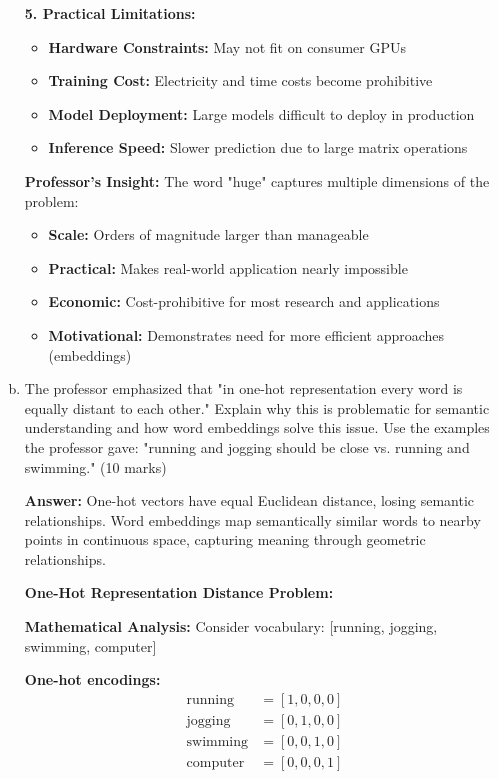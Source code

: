 \documentclass[12pt]{article}
\newcommand{\answer}[1]{{\color{answercolor}\textbf{Answer:} #1}}
\newcommand{\explanation}[1]{{\color{explanationcolor}#1}}
\begin{document}
\begin{enumerate}[(a)]
{    \textbf{5. Practical Limitations:}
    \begin{itemize}
        \item \textbf{Hardware Constraints:} May not fit on consumer GPUs
        \item \textbf{Training Cost:} Electricity and time costs become prohibitive
        \item \textbf{Model Deployment:} Large models difficult to deploy in production
        \item \textbf{Inference Speed:} Slower prediction due to large matrix operations
    \end{itemize}
    
    \textbf{Professor's Insight:}
    The word "huge" captures multiple dimensions of the problem:
    \begin{itemize}
        \item \textbf{Scale:} Orders of magnitude larger than manageable
        \item \textbf{Practical:} Makes real-world application nearly impossible
        \item \textbf{Economic:} Cost-prohibitive for most research and applications
        \item \textbf{Motivational:} Demonstrates need for more efficient approaches (embeddings)
    \end{itemize}
    }
    
    \item The professor emphasized that "in one-hot representation every word is equally distant to each other." Explain why this is problematic for semantic understanding and how word embeddings solve this issue. Use the examples the professor gave: "running and jogging should be close vs. running and swimming." \hfill (10 marks)
    
    \answer{One-hot vectors have equal Euclidean distance, losing semantic relationships. Word embeddings map semantically similar words to nearby points in continuous space, capturing meaning through geometric relationships.}
    
    \explanation{
    \textbf{One-Hot Representation Distance Problem:}
    
    \textbf{Mathematical Analysis:}
    Consider vocabulary: [running, jogging, swimming, computer]
    
    \textbf{One-hot encodings:}
    \begin{align}
    \text{running} &= [1, 0, 0, 0] \\
    \text{jogging} &= [0, 1, 0, 0] \\
    \text{swimming} &= [0, 0, 1, 0] \\
    \text{computer} &= [0, 0, 0, 1]
    \end{align}
    
}
\end{enumerate}
\end{document}
